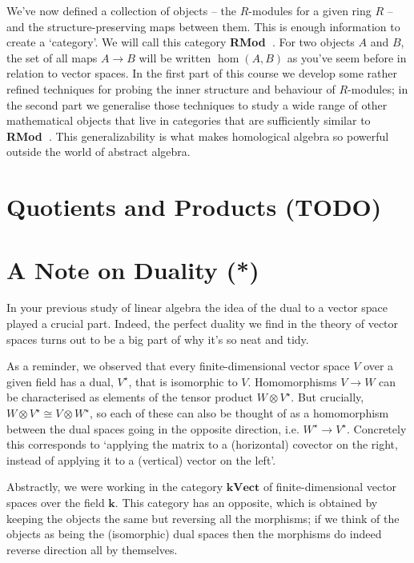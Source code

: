 \documentclass[oneside,english]{amsbook}
\numberwithin{section}{chapter}
\theoremstyle{plain}
\theoremstyle{definition}
\newcommand{\catname}[1]{{\normalfont\textbf{#1}}}
\newcommand{\RMod}{\catname{RMod\ }}
\newcommand{\kVect}{\mathbf{k}\mathbf{Vect}}
\begin{document}
			We've now defined a collection of objects -- the $R$-modules for a given ring $R$ -- and the structure-preserving maps between them. This is enough information to create a `category'. We will call this category \RMod. For two objects $A$ and $B$, the set of all maps $A\to B$ will be written $\hom(A, B)$ as you've seem before in relation to vector spaces. In the first part of this course we develop some rather refined techniques for probing the inner structure and behaviour of $R$-modules; in the second part we generalise those techniques to study a wide range of other mathematical objects that live in categories that are sufficiently similar to \RMod. This generalizability is what makes homological algebra so powerful outside the world of abstract algebra.
		
		\section{Quotients and Products (TODO)}
	
		\section{A Note on Duality (*)}
	
			In your previous study of linear algebra the idea of the dual to a vector space played a crucial part. Indeed, the perfect duality we find in the theory of vector spaces turns out to be a big part of why it's so neat and tidy.
			
			As a reminder, we observed that every finite-dimensional vector space $V$ over a given field has a dual, $V^\star$, that is isomorphic to $V$. Homomorphisms $V\to W$ can be characterised as elements of the tensor product $W\otimes V^\star$. But crucially, $W\otimes V^\star\cong V\otimes W^\star$, so each of these can also be thought of as a homomorphism between the dual spaces going in the opposite direction, i.e. $W^\star\to V^\star$. Concretely this corresponds to `applying the matrix to a (horizontal) covector on the right, instead of applying it to a (vertical) vector on the left'.
			
			Abstractly, we were working in the category $\kVect$ of finite-dimensional vector spaces over the field $\mathbf{k}$. This category has an opposite, which is obtained by keeping the objects the same but reversing all the morphisms; if we think of the objects as being the (isomorphic) dual spaces then the morphisms do indeed reverse direction all by themselves.
			
\end{document}
